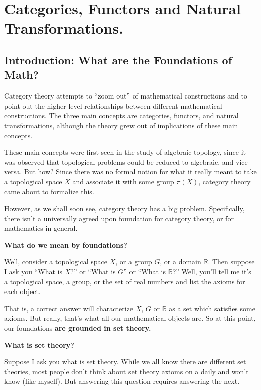 \chapter{Categories, Functors and Natural Transformations.} 
    \section{Introduction: What are the Foundations of Math?} 
    Category theory attempts to ``zoom out'' of mathematical constructions
    and to point out the higher level relationships between different mathematical
    constructions. The three main concepts are categories, functors, and
    natural transformations, although the theory grew out of
    implications of these main concepts. 
    
    
    These main concepts were first seen in the study of algebraic
    topology, since 
    it was observed that topological problems could be reduced to
    algebraic, and vice versa. But how? Since there was no formal
    notion for what it really meant to take a topological space $X$
    and associate it with some group $\pi(X)$, 
    category theory came about to formalize this. 

    However, as we shall soon see, category theory has a big problem. 
    Specifically, there isn't a universally agreed upon foundation for
    category theory, or for mathematics in general. 
    \begin{center}
        \textbf{What do we mean by foundations?}
    \end{center}
    Well, consider a topological space $X$, or a group $G$, or a
    domain $\mathbb{R}$. Then suppose I ask you
    ``What is $X$?'' or ``What is $G$'' or ``What is $\mathbb{R}$?'' 
    Well, you'll tell me it's a topological space, a
    group, or the set of real numbers and
    list the axioms for each object. 

    That is, a correct answer will characterize $X$, $G$ or $\mathbb{R}$ as a
    set which satisfies 
    some axioms. But really, that's what all our mathematical objects
    are. So at this point, our foundations \textbf{are grounded in set
    theory.}

    \begin{center}
        \textbf{What is set theory?}
    \end{center}
    Suppose I ask you what is set theory. While we all know there are 
    different set theories, most people don't think about set theory axioms on a daily 
    and won't know (like myself). But answering
    this question requires answering the next. 

